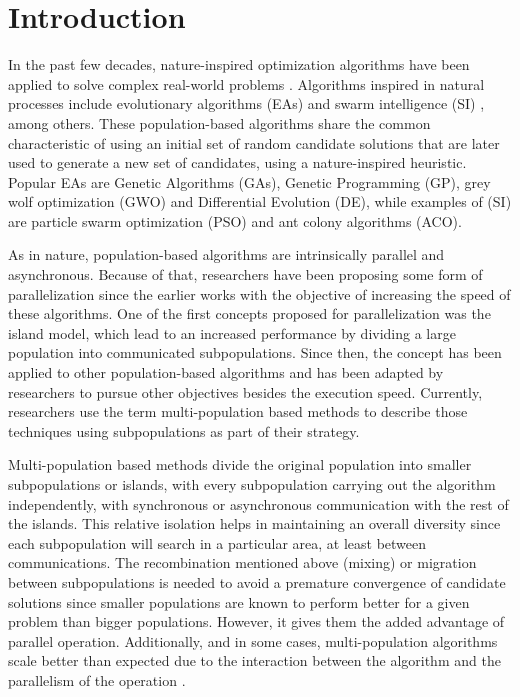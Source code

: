 \documentclass[runningheads]{llncs}
\begin{document}
\section{Introduction}

In the past few decades, nature-inspired optimization algorithms have been
applied to solve complex real-world problems \cite{yang2014nature}. Algorithms
inspired in natural processes include evolutionary algorithms (EAs)
\cite{back1996evolutionary} and swarm intelligence (SI) \cite{kennedy2006swarm},
among others. These population-based algorithms share the common characteristic
of using an initial set of random candidate solutions that are later used to
generate a new set of candidates, using a nature-inspired heuristic. Popular EAs
are Genetic Algorithms (GAs), Genetic Programming (GP), grey wolf optimization
(GWO) and Differential Evolution (DE), while examples of (SI) are particle swarm
optimization (PSO) and ant colony algorithms (ACO).


As in nature, population-based algorithms
are intrinsically parallel and asynchronous. Because of that, researchers have
been proposing some form of parallelization since the earlier works
\cite{muhlenbein1988evolution} with the objective of increasing the speed of
these algorithms. 
One of the first concepts proposed for parallelization was the island model,
which lead to an increased performance \cite{gorges1990explicit,grosso1985computer} 
by dividing a large population into communicated subpopulations.
Since then, the concept has been applied to other population-based algorithms
and has been adapted by researchers to pursue other objectives besides the
execution speed. Currently, researchers use the term multi-population based
methods to describe those techniques using subpopulations as part of their
strategy.

Multi-population based methods divide the original population into
smaller subpopulations or islands, with every subpopulation carrying out the
algorithm independently, with synchronous or asynchronous communication with the
rest of the islands. This relative isolation helps in maintaining an overall
diversity since each subpopulation will search in a particular area, at least
between communications. The recombination mentioned above (mixing) or migration
between subpopulations is needed to avoid a premature convergence of candidate
solutions since smaller populations are known to perform better for a given
problem than bigger populations. However, it gives them the added advantage of
parallel operation. Additionally, and in some cases, multi-population algorithms
scale better than expected due to the interaction between the algorithm and the
parallelism of the operation \cite{ALBA20027}.
\end{document}
